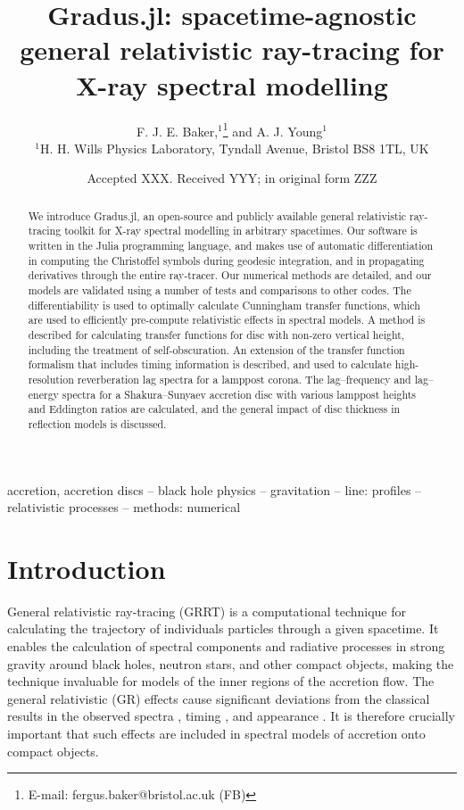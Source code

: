 \documentclass[fleqn,usenatbib]{mnras}
\title[Gradus.jl]{Gradus.jl: spacetime-agnostic general relativistic ray-tracing
for X-ray spectral modelling}
\author[F. J. E. Baker et al.]{
F. J. E. Baker,$^{1}$\thanks{E-mail: fergus.baker@bristol.ac.uk (FB)}
and A. J. Young$^{1}$
\\
$^{1}$H. H. Wills Physics Laboratory, Tyndall Avenue, Bristol BS8 1TL, UK
}
\date{Accepted XXX. Received YYY; in original form ZZZ}
\newcommand{\software}[1]{{\sc #1}}
\newcommand{\Gradus}{\software{Gradus.jl}\xspace}
\begin{document}
\label{firstpage}
\pagerange{\pageref{firstpage}--\pageref{lastpage}}
\maketitle

\begin{abstract}
We introduce \Gradus, an open-source and publicly available general relativistic
ray-tracing toolkit for X-ray spectral modelling in arbitrary spacetimes. Our
software is written in the Julia programming language, and makes use of
automatic differentiation in computing the Christoffel symbols during geodesic
integration, and in propagating derivatives through the entire ray-tracer. Our
numerical methods are detailed, and our models are validated using a number of
tests and comparisons to other codes. The differentiability is used to optimally
calculate Cunningham transfer functions, which are used to efficiently
pre-compute relativistic effects in spectral models. A method is described for
calculating transfer functions for disc with non-zero vertical height, including
the treatment of self-obscuration. An extension of the transfer function
formalism that includes timing information is described, and used to calculate
high-resolution reverberation lag spectra for a lamppost corona. The
lag--frequency and lag--energy spectra for a Shakura--Sunyaev accretion disc
with various lamppost heights and Eddington ratios are calculated, and the
general impact of disc thickness in reflection models is discussed.
\end{abstract}

\begin{keywords}
accretion, accretion discs -- black hole physics -- gravitation -- line: profiles -- relativistic processes -- methods: numerical
\end{keywords}



\section{Introduction}

General relativistic ray-tracing (GRRT) is a computational technique for
calculating the trajectory of individuals particles through a given spacetime.
It enables the calculation of spectral components and radiative processes in
strong gravity around black holes, neutron stars, and other compact objects,
making the technique invaluable for models of the inner regions of the accretion
flow. The general relativistic (GR) effects cause significant deviations from
the classical results in the observed spectra
\citep[e.g.][]{cunningham_optical_1973, fabian_long_2002}, timing
\citep[e.g.][]{stella_measuring_1990, reynolds_x-ray_1999}, and appearance
\citep[e.g.][]{luminet_image_1979}. It is therefore crucially important that
such effects are included in spectral models of accretion onto compact objects.
\end{document}
